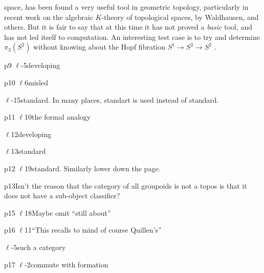 space, has been found a very useful tool in geometric topology, particularly in recent work on the algebraic $K$-theory of topological spaces, by Waldhausen, and others. But it is fair to say that at this time it has not proved a \textit{basic} tool, and has not led itself to computation. An interesting test case is to try and determine $\pi_{3}(S^{2})$ without knowing about the Hopf fibration $S^{1}\to S^{3}\to S^{2}$ .

p9 $\ell$-5\qquad developing

p10 $\ell$6\qquad misled

$\ell$-15\quad standard. In many places, standart is used instead of standard.

p11 $\ell$10\quad the formal analogy

$\ell$12\qquad developing

$\ell$13\qquad standard

p12 $\ell$19\quad standard. Similarly lower down the page.

p13\qquad Isn't the reason that the category of all groupoids is not a topos is that it does not have a sub-object classifier?

p15 $\ell$18\quad Maybe omit ``still about''

p16 $\ell$11\quad ``This recalls to mind of course Quillen's''

$\ell$-5\qquad such a category

p17 $\ell$-2\quad commute with formation



